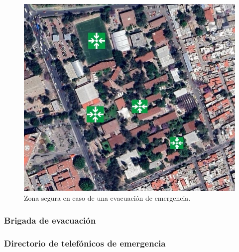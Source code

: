     \begin{figure}[H]
        \centering
        \includegraphics[scale=0.4]{35/Img/puntosReunion.jpg}
        \caption{Zona segura en caso de una evacuación de emergencia.}
    \end{figure}
    
    \subsubsection{Brigada de evacuación}
    
    \subsubsection{Directorio de telefónicos de emergencia}
    
